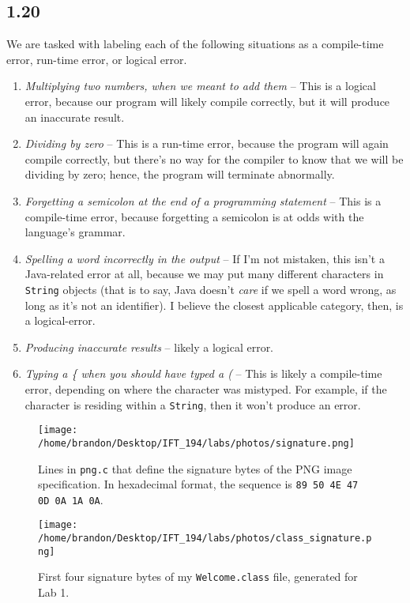 \documentclass[leqno, 11pt]{article}
\begin{document}
\subsection*{1.20}
We are tasked with labeling each of the following situations as a compile-time error, run-time error, or logical error.
\begin{enumerate}
  \item \textit{Multiplying two numbers, when we meant to add them} -- This is a logical error, because our program will likely compile correctly, but it will produce an inaccurate result.
  \item \textit{Dividing by zero} -- This is a run-time error, because the program will again compile correctly, but there's no way for the compiler to know that we will be dividing by zero; hence, the program will terminate abnormally.
  \item \textit{Forgetting a semicolon at the end of a programming statement} -- This is a compile-time error, because forgetting a semicolon is at odds with the language's grammar.
  \item \textit{Spelling a word incorrectly in the output} -- If I'm not mistaken, this isn't a Java-related error at all, because we may put many different characters in \texttt{String} objects (that is to say, Java doesn't \textit{care} if we spell a word wrong, as long as it's not an identifier). I believe the closest applicable category, then, is a logical-error.
  \item \textit{Producing inaccurate results} -- likely a logical error.
  \item \textit{Typing a \{ when you should have typed a (} -- This is likely a compile-time error, depending on where the character was mistyped. For example, if the character is residing within a \texttt{String}, then it won't produce an error.
\end{enumerate}
\newpage
\begin{figure}
  \centering
  \texttt{[image: /home/brandon/Desktop/IFT\_194/labs/photos/signature.png]}
  \caption{Lines in \texttt{png.c} that define the signature bytes of the PNG image specification. In hexadecimal format, the sequence is \texttt{89 50 4E 47 0D 0A 1A 0A}.}
  \label{fig:one}
\end{figure}
\begin{figure}
  \centering
  \texttt{[image: /home/brandon/Desktop/IFT\_194/labs/photos/class\_signature.png]}
  \caption{First four signature bytes of my \texttt{Welcome.class} file, generated for Lab 1.}
  \label{fig:two}
\end{figure}
\end{document}
